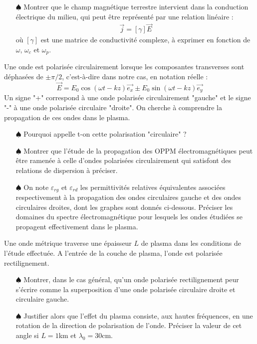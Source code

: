 \documentclass{report}
\begin{document}
\begin{itemize}
	
	\item[$\spadesuit$] Montrer que le champ magnétique terrestre intervient dans la conduction électrique du milieu, qui peut être représenté par une relation linéaire :
	\begin{align*}
		\vec{j}=\left[\gamma \right] \vec{E}
	\end{align*}
	où $\left[\gamma \right]$ est une matrice de conductivité complexe, à exprimer en fonction de $\omega$, $\omega_c$ et $\omega_p$.
	
\end{itemize}

Une onde est polarisée circulairement lorsque les composantes transverses sont déphasées de $\pm\pi/2$, c'est-à-dire dans notre cas, en notation réelle :
\begin{equation}
	\vec{E}=E_0\cos(\omega t - kz)\vec{e_x}\pm E_0\sin(\omega t - kz)\vec{e_y}
\end{equation}
Un signe "+" correspond à une onde polarisée circulairement "gauche" et le signe "-" à une onde polarisée circulaire "droite". On cherche à comprendre la propagation de ces ondes dans le plasma.

\begin{itemize}

	\item[$\spadesuit$] Pourquoi appelle t-on cette polarisation "circulaire" ? 
	
	\item[$\spadesuit$] Montrer que l'étude de la propagation des OPPM électromagnétiques peut être ramenée à celle d'ondes polarisées circulairement qui satisfont des relations de dispersion à préciser. 
	
	\item[$\spadesuit$] On note $\varepsilon_{rg}$ et $\varepsilon_{rd}$ les permittivités relatives équivalentes associées respectivement à la propagation des ondes circulaires gauche et des ondes circulaires droites, dont les graphes sont donnés ci-dessous. Préciser les domaines du spectre électromagnétique pour lesquels les ondes étudiées se propagent effectivement dans le plasma.

\end{itemize}

Une onde métrique traverse une épaisseur $L$ de plasma dans les conditions de l'étude effectuée. A l'entrée de la couche de plasma, l'onde est polarisée rectilignement.

\begin{itemize}
	
	\item[$\spadesuit$] Montrer, dans le cas général, qu'un onde polarisée rectilignement peur s'écrire comme la superposition d'une onde polarisée circulaire droite et circulaire gauche. 
	
	\item[$\spadesuit$] Justifier alors que l'effet du plasma consiste, aux hautes fréquences, en une rotation de la direction de polarisation de l'onde. Préciser la valeur de cet angle si $L=1$km et $\lambda_0=30$cm.
	
\end{itemize}
\end{document}
